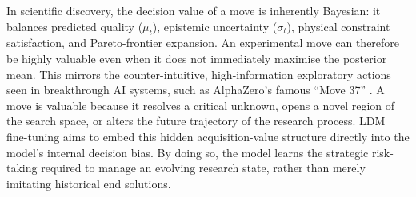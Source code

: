 In scientific discovery, the decision value of a move is inherently Bayesian: it balances predicted quality ($\mu_t$), epistemic uncertainty ($\sigma_t$), physical constraint satisfaction, and Pareto-frontier expansion. An experimental move can therefore be highly valuable even when it does not immediately maximise the posterior mean. This mirrors the counter-intuitive, high-information exploratory actions seen in breakthrough AI systems, such as AlphaZero's famous ``Move 37'' \citep{silver2017mastering,schut2025bridging}. A move is valuable because it resolves a critical unknown, opens a novel region of the search space, or alters the future trajectory of the research process. LDM fine-tuning aims to embed this hidden acquisition-value structure directly into the model's internal decision bias. By doing so, the model learns the strategic risk-taking required to manage an evolving research state, rather than merely imitating historical end solutions.







